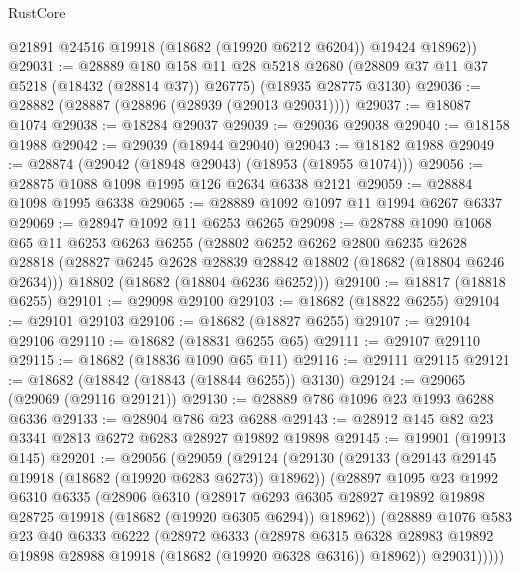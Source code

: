 \begin{lexlean}{RustCore}
\begin{coremodule}
        @21891
        @24516
        @19918
        (@18682 (@19920 @6212 @6204))
        @19424
        @18962))
@29031 := @28889
    @180
    @158
    @11
    @28
    @5218
    @2680
    (@28809 @37 @11 @37 @5218 (@18432 (@28814 @37)) @26775)
    (@18935 @28775 @3130)
@29036 := @28882 (@28887 (@28896 (@28939 (@29013 @29031))))
@29037 := @18087 @1074
@29038 := @18284 @29037
@29039 := @29036 @29038
@29040 := @18158 @1988
@29042 := @29039 (@18944 @29040)
@29043 := @18182 @1988
@29049 := @28874 (@29042 (@18948 @29043) (@18953 (@18955 @1074)))
@29056 := @28875 @1088 @1098 @1995 @126 @2634 @6338 @2121
@29059 := @28884 @1098 @1995 @6338
@29065 := @28889 @1092 @1097 @11 @1994 @6267 @6337
@29069 := @28947 @1092 @11 @6253 @6265
@29098 := @28788
    @1090
    @1068
    @65
    @11
    @6253
    @6263
    @6255
    (@28802
      @6252
      @6262
      @2800
      @6235
      @2628
      @28818
      (@28827 @6245 @2628 @28839 @28842 @18802 (@18682 (@18804 @6246 @2634)))
      @18802
      (@18682 (@18804 @6236 @6252)))
@29100 := @18817 (@18818 @6255)
@29101 := @29098 @29100
@29103 := @18682 (@18822 @6255)
@29104 := @29101 @29103
@29106 := @18682 (@18827 @6255)
@29107 := @29104 @29106
@29110 := @18682 (@18831 @6255 @65)
@29111 := @29107 @29110
@29115 := @18682 (@18836 @1090 @65 @11)
@29116 := @29111 @29115
@29121 := @18682 (@18842 (@18843 (@18844 @6255)) @3130)
@29124 := @29065 (@29069 (@29116 @29121))
@29130 := @28889 @786 @1096 @23 @1993 @6288 @6336
@29133 := @28904 @786 @23 @6288
@29143 := @28912 @145 @82 @23 @3341 @2813 @6272 @6283 @28927 @19892 @19898
@29145 := @19901 (@19913 @145)
@29201 := @29056
    (@29059
      (@29124
        (@29130
          (@29133 (@29143 @29145 @19918 (@18682 (@19920 @6283 @6273)) @18962))
          (@28897
            @1095
            @23
            @1992
            @6310
            @6335
            (@28906
              @6310
              (@28917
                @6293
                @6305
                @28927
                @19892
                @19898
                @28725
                @19918
                (@18682 (@19920 @6305 @6294))
                @18962))
            (@28889
              @1076
              @583
              @23
              @40
              @6333
              @6222
              (@28972
                @6333
                (@28978
                  @6315
                  @6328
                  @28983
                  @19892
                  @19898
                  @28988
                  @19918
                  (@18682 (@19920 @6328 @6316))
                  @18962))
              @29031)))))

\end{coremodule}
\end{lexlean}
